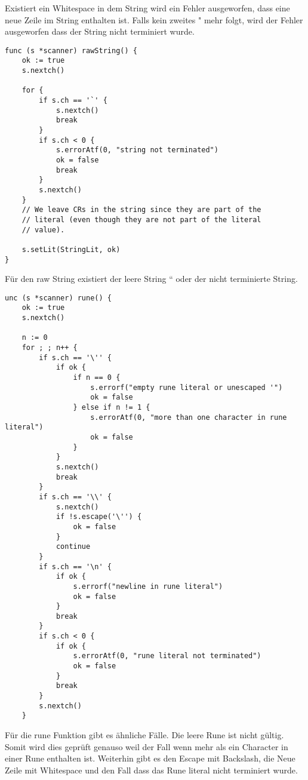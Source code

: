 Existiert ein Whitespace in dem String wird ein Fehler ausgeworfen, dass eine neue Zeile im String enthalten ist. Falls kein zweites " mehr folgt, wird der Fehler ausgeworfen dass der String nicht terminiert wurde.
\begin{lstlisting}
func (s *scanner) rawString() {
	ok := true
	s.nextch()

	for {
		if s.ch == '`' {
			s.nextch()
			break
		}
		if s.ch < 0 {
			s.errorAtf(0, "string not terminated")
			ok = false
			break
		}
		s.nextch()
	}
	// We leave CRs in the string since they are part of the
	// literal (even though they are not part of the literal
	// value).

	s.setLit(StringLit, ok)
}
\end{lstlisting}
Für den raw String existiert der leere String `` oder der nicht terminierte String.
\begin{lstlisting}
unc (s *scanner) rune() {
	ok := true
	s.nextch()

	n := 0
	for ; ; n++ {
		if s.ch == '\'' {
			if ok {
				if n == 0 {
					s.errorf("empty rune literal or unescaped '")
					ok = false
				} else if n != 1 {
					s.errorAtf(0, "more than one character in rune literal")
					ok = false
				}
			}
			s.nextch()
			break
		}
		if s.ch == '\\' {
			s.nextch()
			if !s.escape('\'') {
				ok = false
			}
			continue
		}
		if s.ch == '\n' {
			if ok {
				s.errorf("newline in rune literal")
				ok = false
			}
			break
		}
		if s.ch < 0 {
			if ok {
				s.errorAtf(0, "rune literal not terminated")
				ok = false
			}
			break
		}
		s.nextch()
	}
\end{lstlisting}
Für die rune Funktion gibt es ähnliche Fälle. Die leere Rune ist nicht gültig. Somit wird dies geprüft genauso weil der Fall wenn mehr als ein Character in einer Rune enthalten ist. Weiterhin gibt es den Escape mit Backslash, die Neue Zeile mit Whitespace und den Fall dass das Rune literal nicht terminiert wurde.
